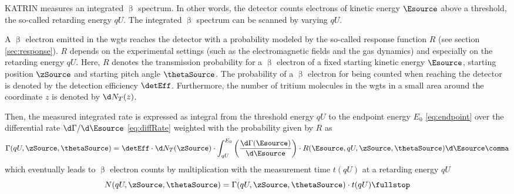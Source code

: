 KATRIN measures an integrated $\upbeta$ spectrum. In other words, the detector counts electrons of kinetic energy $\Esource$ above a threshold, the so-called retarding energy $qU$. The integrated $\upbeta$ spectrum can be scanned by varying $qU$.

A $\upbeta$ electron emitted in the \gls{wgts} reaches the detector with a probability modeled by the so-called response function $R$ (see section \ref{sec:response}). $R$ depends on the experimental settings (such as the electromagnetic fields and the gas dynamics) and especially on the retarding energy $qU$. Here, $R$ denotes the transmission probability for a $\upbeta$ electron of a fixed starting kinetic energy $\Esource$, starting position $\zSource$ and starting pitch angle $\thetaSource$. The probability of a $\upbeta$ electron for being counted when reaching the detector is denoted by the detection efficiency $\detEff$. Furthermore, the number of tritium molecules in the \gls{wgts} in a small area around the coordinate $z$ is denoted by $\d N_T(z)$. 

Then, the measured integrated rate is expressed as integral from the threshold energy $qU$ to the endpoint energy $E_0$ \eqref{eq:endpoint} over the differential rate $\d \Gamma / \d \Esource$ \eqref{eq:diffRate} weighted with the probability given by $R$ as
\begin{equation}
\label{eq:rateDependingOnstartingValues}
\Gamma(qU, \zSource, \thetaSource) = 
\detEff \cdot
\d N_T(\zSource) \cdot
\int_{qU}^{E_0} 
    \left(\frac{\d \Gamma(\Esource)}{\d \Esource}\right) \cdot 
    R(\Esource, qU, \zSource, \thetaSource) 
\d \Esource
\comma
\end{equation}
which eventually leads to $\upbeta$ electron counts by multiplication with the measurement time $t(qU)$ at a retarding energy $qU$
\begin{equation}
    \label{eq:countsDependingOnPositionAndPitchAngle}
    N(qU, \zSource, \thetaSource) = \Gamma(qU, \zSource, \thetaSource) \cdot t(qU)
    \fullstop
\end{equation}

